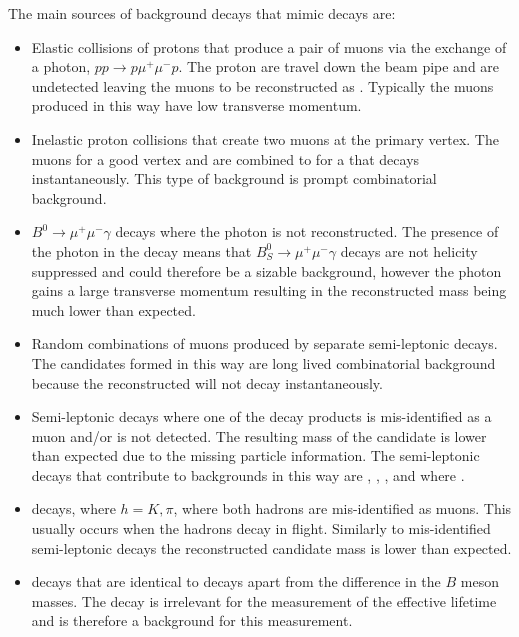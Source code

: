 The main sources of background decays that mimic \bsmumu decays are:
\begin{itemize}
\item Elastic collisions of protons that produce a pair of muons via the exchange of a photon, $pp \to p \mu^{+} \mu^{-} p$. The proton are travel down the beam pipe and are undetected leaving the muons to be reconstructed as \bsmumu. Typically the muons produced in this way have low transverse momentum. %
\item Inelastic proton collisions that create two muons at the primary vertex. The muons for a good vertex and are combined to for a \bs that decays instantaneously. This type of background is prompt combinatorial background. 
\item $B_{}^{0}\to\mu^{+}\mu^{-}\gamma$ decays where the photon is not reconstructed. The presence of the photon in the decay means that $B_{S}^{0}\to\mu^{+}\mu^{-}\gamma$ decays are not helicity suppressed and could therefore be a sizable background, however the photon gains a large transverse momentum resulting in the reconstructed \bs mass being much lower than expected.
\item Random combinations of muons produced by separate semi-leptonic decays. The \bsmumu candidates formed in this way are long lived combinatorial background because the reconstructed \bs will not decay instantaneously. %
\item Semi-leptonic decays where one of the decay products is mis-identified as a muon and/or is not detected. The resulting mass of the \bs candidate is lower than expected due to the missing particle information. The semi-leptonic decays that contribute to \bsmumu backgrounds in this way are \bdpimunu, \bsKmunu, \bpimumu, \bdpimumu and \bcjpsimunu where \jpsimumu.
\item \bhh decays, where $ h  = K, \pi$, where both hadrons are mis-identified as muons. This usually occurs when the hadrons decay in flight. Similarly to mis-identified semi-leptonic decays the reconstructed \bs candidate mass is lower than expected.
\item \bdmumu decays that are identical to \bsmumu decays apart from the difference in the $B$ meson masses. The \bd decay is irrelevant for the measurement of the \bsmumu effective lifetime and is therefore a background for this measurement.
\end{itemize}

